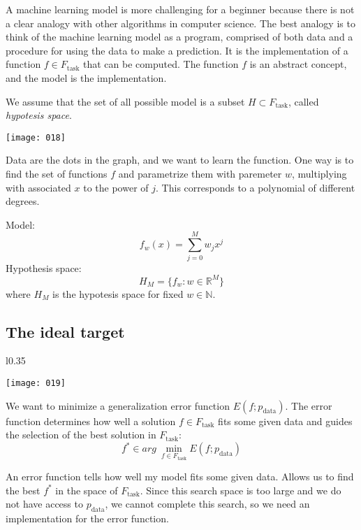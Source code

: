 A machine learning model is more challenging for a beginner because there is not a clear analogy with other algorithms in computer science. The best analogy is to think of the machine learning model as a program, comprised of both data and a procedure for using the data to make a prediction. It is the implementation of a function \(f \in F_{\text{task}}\) that can be computed. The function \(f\) is an abstract concept, and the  model is the implementation.

We assume that the set of all possible model is a subset \(H \subset F_{\text{task}}\), called \emph{hypotesis space}.

\begin{example}
    \begin{center}
        \texttt{[image: 018]}
    \end{center}
    Data are the dots in the graph, and we want to learn the function. One way is to find the set of functions \(f\) and parametrize them with paremeter \(w\), multiplying with associated \(x\) to the power of \(j\). This corresponds to a polynomial of different degrees. 
    
    Model:
    \[f_w(x)= \sum_{j=0}^{M} w_jx^j\]
    Hypothesis space:
    \[H_M=\{f_w:w\in \mathbb{R}^M\}\]
    where \(H_M\) is the hypotesis space for fixed \(w \in \mathbb{N}\).
\end{example}

\subsection{The ideal target}
\begin{wrapfigure}{l}{0.35\textwidth}
\begin{center}
    \texttt{[image: 019]}
\end{center}
\label{fig:019}
\end{wrapfigure}
We want to minimize a generalization error function \(E(f;p_{\text{data}})\). The error function determines how well a solution \(f \in F_{\text{task}}\) fits some given data and guides the selection of the best solution in \(F_{\text{task}}\):
\[f^* \in arg\ \min_{f \in F_\text{task}} E(f; p_{\text{data}})\]

An error function tells how well my model fits some given data. Allows us to find the best \(f^*\) in the space of \(F_{\text{task}}\). Since this search space is too large and we do not have access to \(p_{\text{data}}\), we cannot complete this search, so we need an implementation for the error function.

